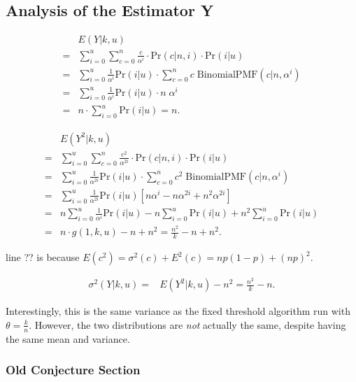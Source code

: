 \documentclass{sig-alternate}
\begin{document}
\subsection{Analysis of the Estimator Y}

\begin{align}
 & E(Y|k,u)  \\
= &    \sum_{i=0}^u    \sum_{c=0}^{n}    \frac{c}{\alpha^i}   \cdot \mathrm{Pr}(c|n,i)   \cdot \mathrm{Pr}(i|u) \\
= &    \sum_{i=0}^u  \frac{1}{\alpha^i}  \mathrm{Pr}(i|u)  \cdot \sum_{c=0}^{n} c \; \mathrm{BinomialPMF}(c|n,\alpha^i) \\     %
= &    \sum_{i=0}^u  \frac{1}{\alpha^i}  \mathrm{Pr}(i|u)  \cdot n \; \alpha^i \\
= & n \cdot \sum_{i=0}^u \mathrm{Pr}(i|u) = n.
\end{align}

\begin{align}
  & E(Y^2|k,u)  \\
= &    \sum_{i=0}^u    \sum_{c=0}^{n}    \frac{c^2}{\alpha^{2i}}   \cdot \mathrm{Pr}(c|n,i)   \cdot \mathrm{Pr}(i|u) \\
= &    \sum_{i=0}^u  \frac{1}{\alpha^{2i}}  \mathrm{Pr}(i|u)  \cdot \sum_{c=0}^{n} c^2 \; \mathrm{BinomialPMF}(c|n,\alpha^i) \\     %
= &    \sum_{i=0}^u  \frac{1}{\alpha^{2i}}  \mathrm{Pr}(i|u)  \left[ n \alpha^i - n \alpha^{2i} + n^2 \alpha^{2i} \right] \\
= &  n \sum_{i=0}^u  \frac{1}{\alpha^{i}} \mathrm{Pr}(i|u) - n \sum_{i=0}^u \mathrm{Pr}(i|u) + n^2 \sum_{i=0}^u \mathrm{Pr}(i|u) \\
= & n \cdot g(1,k,u) - n + n^2 = \frac{n^2}{k} - n + n^2.
\end{align}

\noindent line ?? is because $E(c^2) = \sigma^2(c) + E^2(c) = np(1-p) + (np)^2$.

\begin{align}
 \sigma^2(Y|k,u) = & E(Y^2|k,u) - n^2 = \frac{n^2}{k} - n.
\end{align}

Interestingly, this is the same variance as the fixed threshold algorithm run with $\theta = \frac{k}{n}$.
However, the two distributions are {\em not} actually the same, despite having the same mean and variance.

\subsubsection{Old Conjecture Section}
\end{document}
